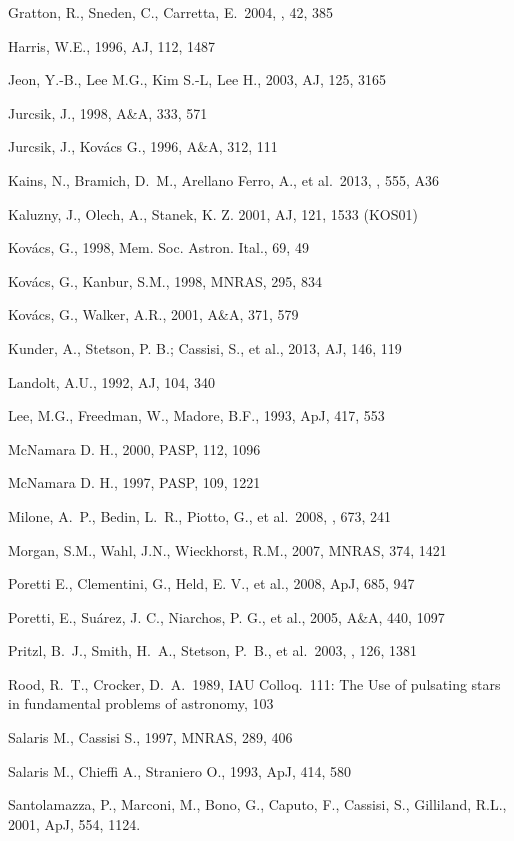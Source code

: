 \documentclass[journal]{rmaa}
\newcommand{\1}{\'{\i}}
\begin{document}
\begin{thebibliography}
\bibitem{} Gratton, R., Sneden, C., Carretta, E.\ 2004, \araa, 42, 385

\bibitem{} Harris, W.E., 1996, AJ, 112, 1487

\bibitem{} Jeon, Y.-B., Lee M.G., Kim S.-L, Lee H., 2003, AJ, 125, 3165

\bibitem{} Jurcsik, J., 1998, A\&A, 333, 571

\bibitem{} Jurcsik, J., Kov\'acs G., 1996, A\&A, 312, 111

\bibitem{} Kains, N., Bramich, D.~M., Arellano
Ferro, A., et al.\ 2013, \aap, 555, A36

\bibitem{} Kaluzny, J., Olech, A., Stanek, K. Z. 2001, AJ, 121, 1533 (KOS01)

\bibitem{} Kov\'acs, G., 1998, Mem. Soc. Astron. Ital., 69, 49

\bibitem{} Kov\'acs, G., Kanbur, S.M., 1998, MNRAS, 295, 834

\bibitem{} Kov\'acs, G., Walker, A.R., 2001, A\&A, 371, 579

\bibitem{} Kunder, A., Stetson, P. B.; Cassisi, S., et al., 2013, AJ, 146, 119

\bibitem{} Landolt, A.U., 1992, AJ, 104, 340

\bibitem{} Lee, M.G., Freedman, W., Madore, B.F., 1993, ApJ, 417, 553

\bibitem{} McNamara D. H., 2000, PASP, 112, 1096

\bibitem{} McNamara D. H., 1997, PASP, 109, 1221

\bibitem{} Milone, A.~P., Bedin, L.~R., Piotto, G., et al.\ 2008, \apj, 673, 241

\bibitem{} Morgan, S.M., Wahl, J.N., Wieckhorst, R.M., 2007, MNRAS, 374, 1421

\bibitem{} Poretti E., Clementini, G., Held, E. V., et al., 2008, ApJ, 685, 947

\bibitem{} Poretti, E., Su\'arez, J. C., Niarchos, P. G., et al., 2005, A\&A, 440,
1097

\bibitem{} Pritzl, B.~J., Smith, H.~A., Stetson, P.~B., et al.\ 2003, \aj, 126, 1381

\bibitem{} Rood, R.~T., Crocker, D.~A.\ 1989, IAU Colloq.~111: The Use of pulsating
stars in fundamental problems of astronomy, 103

\bibitem{} Salaris M., Cassisi S., 1997, MNRAS, 289, 406

\bibitem{} Salaris M., Chieffi A., Straniero O., 1993, ApJ, 414, 580

\bibitem{} Santolamazza, P., Marconi, M., Bono, G., Caputo, F., Cassisi, S.,
Gilliland, R.L., 2001, ApJ, 554, 1124.


\end{thebibliography}
\end{document}

